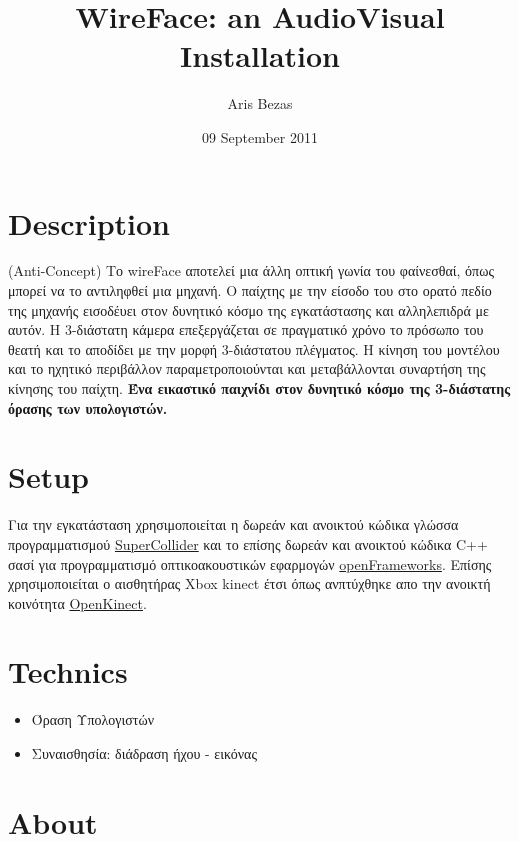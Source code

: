 \documentclass[11pt, a4paper]{scrartcl}
\begin{document}
\title{WireFace: an AudioVisual Installation}
\author{Aris Bezas}
\date{09 September 2011}
\maketitle

\setcounter{tocdepth}{3}
\tableofcontents
\vspace*{1cm}




\section{Description}
\label{sec-1}

(Anti-Concept) 
Το wireFace αποτελεί μια άλλη οπτική γωνία του φαίνεσθαί, όπως μπορεί να το αντιληφθεί μια μηχανή. Ο παίχτης με την είσοδο του στο ορατό πεδίο της μηχανής εισοδέυει στον δυνητικό κόσμο της εγκατάστασης και αλληλεπιδρά με αυτόν. Η 3-διάστατη κάμερα επεξεργάζεται σε πραγματικό χρόνο το πρόσωπο του θεατή και το αποδίδει με την μορφή 3-διάστατου πλέγματος. Η κίνηση του μοντέλου και το ηχητικό περιβάλλον παραμετροποιούνται και μεταβάλλονται συναρτήση της κίνησης του παίχτη. 
\textbf{Ένα εικαστικό παιχνίδι στον δυνητικό κόσμο της 3-διάστατης όρασης των υπολογιστών.}
\section{Setup}
\label{sec-2}

Για την εγκατάσταση χρησιμοποιείται η δωρεάν και ανοικτού κώδικα γλώσσα προγραμματισμού \href{http://supercollider.sourceforge.net/}{SuperCollider} και το επίσης δωρεάν και ανοικτού κώδικα C++ σασί για προγραμματισμό οπτικοακουστικών εφαρμογών \href{http://www.openframeworks.cc/}{openFrameworks}. Επίσης χρησιμοποιείται ο αισθητήρας Xbox kinect έτσι όπως ανπτύχθηκε απο την ανοικτή κοινότητα \href{http://openkinect.org/wiki/Main_Page}{OpenKinect}.
\section{Technics}
\label{sec-3}

\begin{itemize}
\item Όραση Υπολογιστών
\item Συναισθησία: διάδραση ήχου - εικόνας
\end{itemize}
\section{About}
\label{sec-4}
\end{document}
